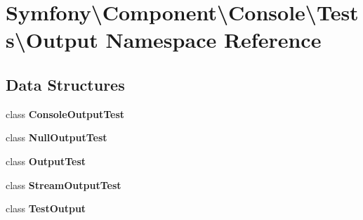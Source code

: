 \section{Symfony\textbackslash{}Component\textbackslash{}Console\textbackslash{}Tests\textbackslash{}Output Namespace Reference}
\label{namespace_symfony_1_1_component_1_1_console_1_1_tests_1_1_output}
\subsection*{Data Structures}
\begin{DoxyCompactItemize}
\item 
class {\bf Console\+Output\+Test}
\item 
class {\bf Null\+Output\+Test}
\item 
class {\bf Output\+Test}
\item 
class {\bf Stream\+Output\+Test}
\item 
class {\bf Test\+Output}
\end{DoxyCompactItemize}

